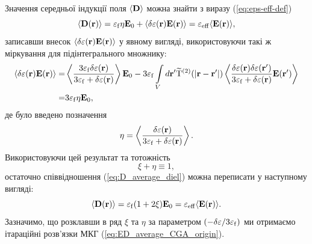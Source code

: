 \documentclass[14pt,twoside]{vakthesis}
\begin{document}
Значення середньої індукції поля $\langle \bf D \rangle$ можна знайти з виразу (\ref{eq:eps-eff-def})
\begin{equation}\label{eq:D_average_diel}
\langle {\bf D} ({\bf r}) \rangle = \varepsilon_{\rm f} \eta {\bf E}_0 + \langle \delta\varepsilon ({\bf r}) {\bf E}({\bf r}) \rangle
= \varepsilon_{\rm eff} \langle {\bf E}({\bf r}) \rangle,
\end{equation}
записавши внесок $\langle \delta\varepsilon ({\bf r}) {\bf E}({\bf r}) \rangle$ у явному вигляді, використовуючи такі ж міркування для підінтегрального множнику:
\begin{equation}
\begin{split}
\langle \delta\varepsilon ({\bf r}) {\bf E}({\bf r}) \rangle
=&  \left\langle { \frac{3 \varepsilon_{\rm f} \delta\varepsilon({\bf r})}{3 \varepsilon_{\rm f} + \delta\varepsilon({\bf r})} } \right\rangle {\bf E}_0 - 3 \varepsilon_{\rm f} \int\limits_V {d{\mathbf{r}}'} { \rm{\widetilde T}}^{(2)} (| {\bf r} - {\bf r}' |)     \left\langle \frac{\delta \varepsilon ({\mathbf{r}}) \delta \varepsilon ({\mathbf{r}}')}{3 \varepsilon_{\rm f} + \delta \varepsilon({\bf r})}{\mathbf{E}}({\mathbf{r}}') \right\rangle \\
=& 3 \varepsilon_{\rm f} \eta {\bf E}_0, 
\end{split}
\end{equation}
де було введено позначення
$$
\eta = \left\langle { \frac{ \delta\varepsilon({\bf r})}{3 \varepsilon_{\rm f} + \delta\varepsilon({\bf r})} } \right\rangle.
$$
Використовуючи цей результат та тотожність
\begin{equation}\label{eq:xi-eta_rel}
\xi + \eta \equiv 1,
\end{equation}
остаточно співвідношення (\ref{eq:D_average_diel}) можна переписати у наступному вигляді:
\begin{equation}\label{eq:D_average_diel2}
\langle {\bf D} ({\bf r}) \rangle
= \varepsilon_{\rm f} (1 + 2\xi) {\bf E}_0
= \varepsilon_{\rm eff} \langle {\bf E}({\bf r}) \rangle.
\end{equation}
Зазначимо, що розклавши в ряд $\xi$ та $\eta$
за параметром $(- \delta\varepsilon/3\varepsilon_{\rm f})$
ми отримаємо ітараційні розв'язки МКГ (\ref{eq:ED_average_CGA_origin}).
\end{document}
